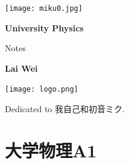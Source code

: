\documentclass[
	12pt, %
	a4paper, %
]{myLegrandOrangeBook}
\begin{document}

\titlepage %
	{\texttt{[image: miku0.jpg]}} %
	{ %
		\centering\sffamily %
		{\Huge\bfseries University Physics\par} %
		\vspace{12pt} %
		{\LARGE Notes\par} %
		\vspace{20pt} %
		{\huge\bfseries Lai Wei\par} %
		\vspace{36pt} %
        {\texttt{[image: logo.png]}\par}
	}


    \begin{dedication}
        Dedicated to {\kaishu 我自己}和{\kaishu 初音ミク}.
    \end{dedication}


\pagestyle{empty} %

\tableofcontents %

\pagestyle{fancy} %

\cleardoublepage %


\part{大学物理A1}
\end{document}
